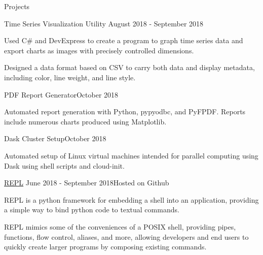 \documentclass{resume} %
\begin{document}

\begin{rSection}{Projects}

\begin{rSubsection} {Time Series Visualization Utility}
    {August 2018 - September 2018}{}

    \item Used C\# and DevExpress to create a program to graph time series data
        and export charts as images with precisely controlled dimensions.

    \item Designed a data format based on CSV to carry both data and display
        metadata, including color, line weight, and line style.

\end{rSubsection}

\begin{rSubsection}{PDF Report Generator}{October 2018}{}

    \item Automated report generation with Python, pypyodbc, and PyFPDF. Reports
        include numerous charts produced using Matplotlib.

\end{rSubsection}

\begin{rSubsection}{Dask Cluster Setup}{October 2018}{}

\item Automated setup of Linux virtual machines intended for parallel computing
    using Dask using shell scripts and cloud-init.

\end{rSubsection}

\begin{rSubsection}
    {\href{https://github.com/946336/The-Worst-REPL}{REPL}}
    {June 2018 - September 2018}{Hosted on Github}

\item REPL is a python framework for embedding a shell into an application,
    providing a simple way to bind python code to textual commands.

\item REPL mimics some of the conveniences of a POSIX shell, providing pipes,
    functions, flow control, aliases, and more, allowing developers and end
    users to quickly create larger programs by composing existing commands.


\end{rSubsection}
\end{rSection}
\end{document}
